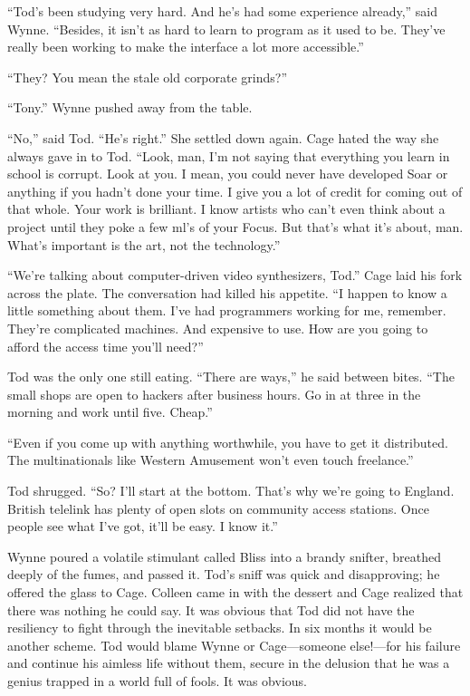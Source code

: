 ``Tod's been studying very hard. And he's had some experience already,'' said Wynne. ``Besides, it isn't as hard to learn to program as it used to be. They've really been working to make the interface a lot more accessible.''

``They? You mean the stale old corporate grinds?''

``Tony.'' Wynne pushed away from the table.

``No,'' said Tod. ``He's right.'' She settled down again. Cage hated the way she always gave in to Tod. ``Look, man, I'm not saying that everything you learn in school is corrupt. Look at you. I mean, you could never have developed Soar or anything if you hadn't done your time. I give you a lot of credit for coming out of that whole. Your work is brilliant. I know artists who can't even think about a project until they poke a few ml's of your Focus. But that's what it's about, man. What's important is the art, not the technology.''

``We're talking about computer-driven video synthesizers, Tod.'' Cage laid his fork across the plate. The conversation had killed his appetite. ``I happen to know a little something about them. I've had programmers working for me, remember. They're complicated machines. And expensive to use. How are you going to afford the access time you'll need?''

Tod was the only one still eating. ``There are ways,'' he said between bites. ``The small shops are open to hackers after business hours. Go in at three in the morning and work until five. Cheap.''

``Even if you come up with anything worthwhile, you have to get it distributed. The multinationals like Western Amusement won't even touch freelance.''

Tod shrugged. ``So? I'll start at the bottom. That's why we're going to England. British telelink has plenty of open slots on community access stations. Once people see what I've got, it'll be easy. I know it.''

Wynne poured a volatile stimulant called Bliss into a brandy snifter, breathed deeply of the fumes, and passed it. Tod's sniff was quick and disapproving; he offered the glass to Cage. Colleen came in with the dessert and Cage realized that there was nothing he could say. It was obvious that Tod did not have the resiliency to fight through the inevitable setbacks. In six months it would be another scheme. Tod would blame Wynne or Cage---someone else!---for his failure and continue his aimless life without them, secure in the delusion that he was a genius trapped in a world full of fools. It was obvious.

